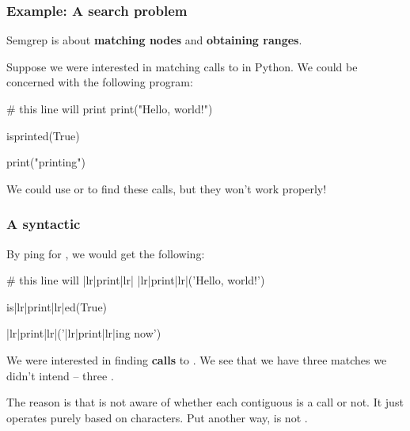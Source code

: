 \documentclass[aspectratio=169, handout]{beamer}
\begin{document}
\begin{frame}[fragile]
  \frametitle{Example: A search problem}

  Semgrep is about \textbf{matching nodes} and \textbf{obtaining ranges}.

  \pause
  \vspace{\fill}

  Suppose we were interested in matching calls to  in Python. We could
  be concerned with the following program:

  \vspace{5pt}

  \begin{pythoncodeblock}
    # this line will print
    print("Hello, world!")

    isprinted(True)

    print("printing")
  \end{pythoncodeblock}

  \pause
  \vspace{\fill}

  We could use  or  to find these calls, but they won't
  work properly!
\end{frame}


\begin{frame}[fragile]
  \frametitle{A syntactic }

  By ping for , we would get the following:

  \pause
  \vspace{5pt}

  \begin{codeblock}
    # this line will |lr|print|lr|
    |lr|print|lr|('Hello, world!')

    is|lr|print|lr|ed(True)

    |lr|print|lr|('|lr|print|lr|ing now')
  \end{codeblock}

  \pause
  \vspace{\fill}

  We were interested in finding \textbf{calls} to . We see
  that we have three matches we didn't intend -- three .

  \pause
  \vspace{\fill}

  The reason is that  is not aware of whether each contiguous 
  is a call or not. It just operates purely based on characters. Put another way,
   is not .
\end{frame}
\end{document}

